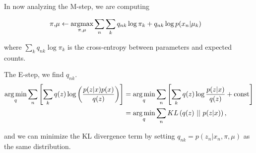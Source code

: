\documentclass{article}
\begin{document}
\smallskip

In now analyzing the M-step, we are computing 


\begin{align*}
\pi \text{,} \mu &\gets \underset{{\pi \text{,} \mu}}{\text{argmax}} \sum_n \sum_k q_{nk} 
\log \pi_k + q_{nk} \log p(x_n |  \mu_k)
\end{align*}

where $\displaystyle \sum_k q_{nk} \log \pi_k$ is the cross-entropy between parameters and expected counts.

The E-step, we find $q_{nk}$.  
\begin{align*}
\argmin_{q} \sum_{n} \left[ \sum_k q(z) \log \left(\frac{p(z|x) p(x)}{q(z)} \right) \right]	&= \argmin_q \sum_{n} \left[ \sum_k q(z) \log \frac{p(z|x)}{q(z)} + \text{const} \right] \\
&= \argmin_q \sum_n KL\left( q(z)\ ||\ p(z|x) \right),
\end{align*}

and we can minimize the KL divergence term by setting $q_{nk} = p(z_n | x_n, \pi,\mu)$ as the same distribution.
\end{document}
